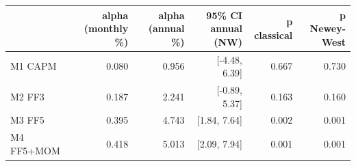 \begin{tabular}{lrrrrr}
\toprule
 & alpha (monthly \%) & alpha (annual \%) & 95\% CI annual (NW) & p classical & p Newey-West \\
\midrule
M1 CAPM & 0.080 & 0.956 & [-4.48, 6.39] & 0.667 & 0.730 \\
M2 FF3 & 0.187 & 2.241 & [-0.89, 5.37] & 0.163 & 0.160 \\
M3 FF5 & 0.395 & 4.743 & [1.84, 7.64] & 0.002 & 0.001 \\
M4 FF5+MOM & 0.418 & 5.013 & [2.09, 7.94] & 0.001 & 0.001 \\
\bottomrule
\end{tabular}
